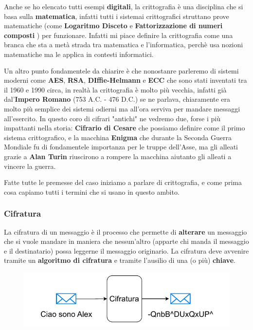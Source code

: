 \documentclass{report}
\begin{document}
Anche se ho elencato tutti esempi \textbf{digitali}, la crittografia è una disciplina che si basa sulla \textbf{matematica}, infatti tutti i sistemai crittografici struttano prove matematiche (come \textbf{Logaritmo Disceto} e \textbf{Fattorizzazione di numeri composti }) per funzionare. Infatti mi piace definire la crittografia come una branca che sta a metà strada tra matematica e l'informatica, perchè usa nozioni matematiche ma le applica in contesti informatici.

Un altro punto fondamentele da chiarire è che nonostanre parleremo di sistemi moderni come \textbf{AES}, \textbf{RSA}, \textbf{DIffie-Helmann} e \textbf{ECC} che sono stati inventati tra il 1960 e 1990 circa, in realtà la crittografia è molto più vecchia, infatti già dal'\textbf{Impero Romano} (753 A.C. - 476 D.C.) se ne parlava, chiaramente era molto più semplice dei sistemi odierni ma all'ora serviva per mandare messaggi all'esercito. In questo coro di cifrari "antichi" ne vedremo due, forse i più impattanti nella storia: \textbf{Cifrario di Cesare} che possiamo definire come il primo sistema crittografico, e la macchina \textbf{Enigma} che durante la Seconda Guerra Mondiale fu di fondamentele importanza per le truppe dell'Asse, ma gli alleati grazie a \textbf{Alan Turin} riuscirono a rompere la macchina aiutanto gli alleati a vincere la guerra. 

Fatte tutte le premesse del caso iniziamo a parlare di crittografia, e come prima cosa capiamo tutti i termini che si usano in questo ambito.

\subsubsection{Cifratura} La cifratura di un messaggio è il processo che permette di \textbf{alterare} un messaggio che si vuole mandare in maniera che nessun'altro (apparte chi manda il messaggio e il destinatario) possa leggerne il messaggio originario. La cifratura deve avvenire tramite un \textbf{algoritmo di cifratura} e tramite l'ausilio di una (o più) \textbf{chiave}.


\begin{figure}[h]
     \centering
    \includegraphics[width=0.8\linewidth]{logos/cripto2.pdf}
\end{figure}
\end{document}
